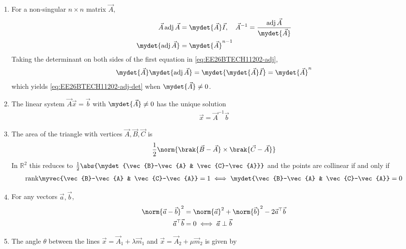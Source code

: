 \begin{enumerate}[label=\thesubsection.\arabic*, ref=\thesubsection.\theenumi]
\item For a non-singular $n \times n$ matrix $\vec{A}$,
\begin{align}
	\vec{A}\,\text{adj}\,\vec{A} &= \mydet{\vec{A}}\vec{I}, \quad
	\vec{A}^{-1} = \frac{\text{adj}\,\vec{A}}{\mydet{\vec{A}}}
	\label{eq:EE26BTECH11202-adj}
	\\
	\mydet{\text{adj}\,\vec{A}} &= \mydet{\vec{A}}^{n-1}
	\label{eq:EE26BTECH11202-adj-det}
\end{align}
\solution
Taking the determinant on both sides of the first equation in
\eqref{eq:EE26BTECH11202-adj},
\begin{align}
	\mydet{\vec{A}}\mydet{\text{adj}\,\vec{A}} = \mydet{\mydet{\vec{A}}\vec{I}} = \mydet{\vec{A}}^{n}
\end{align}
which yields \eqref{eq:EE26BTECH11202-adj-det} when $\mydet{\vec{A}} \ne 0$.
\item The linear system $\vec{A}\vec{x} = \vec{b}$ with $\mydet{\vec{A}} \ne 0$ has the unique solution
\begin{align}
	\vec{x} = \vec{A}^{-1}\vec{b}
	\label{eq:EE26BTECH11202-linsys}
\end{align}
\item The area of the triangle with vertices $\vec{A}, \vec{B}, \vec{C}$ is
\begin{align}
	\frac{1}{2}\norm{\brak{\vec{B}-\vec{A}}\times\brak{\vec{C}-\vec{A}}}
	\label{eq:EE26BTECH11202-area}
\end{align}
In $\mathbb{R}^2$ this reduces to $\frac{1}{2}\abs{\mydet{\vec{B}-\vec{A} & \vec{C}-\vec{A}}}$ and the points are collinear if and only if
\begin{align}
	\text{rank}\myvec{\vec{B}-\vec{A} & \vec{C}-\vec{A}} = 1
	\iff
	\mydet{\vec{B}-\vec{A} & \vec{C}-\vec{A}} = 0
	\label{eq:EE26BTECH11202-collinear}
\end{align}
\item For any vectors $\vec{a}, \vec{b}$,
\begin{align}
	\norm{\vec{a}-\vec{b}}^2 &= \norm{\vec{a}}^2 + \norm{\vec{b}}^2 - 2\vec{a}^{\top}\vec{b}
	\label{eq:EE26BTECH11202-norm-id}
	\\
	\vec{a}^{\top}\vec{b} &= 0 \iff \vec{a} \perp \vec{b}
	\label{eq:EE26BTECH11202-ortho}
\end{align}
\item The angle $\theta$ between the lines $\vec{x} = \vec{A}_1 + \lambda\vec{m}_1$ and $\vec{x} = \vec{A}_2 + \mu\vec{m}_2$ is given by

\end{enumerate}
